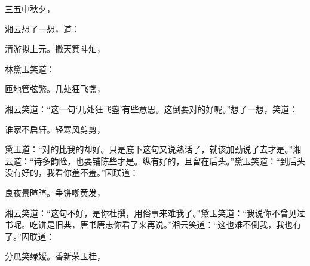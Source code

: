 \begin{poem}
    \begin{pl}三五中秋夕，\end{pl}
\end{poem}


\begin{parag}
    湘云想了一想，道：
\end{parag}


\begin{poem}
    \begin{pl} 清游拟上元。撒天箕斗灿，\end{pl}
\end{poem}


\begin{parag}
    林黛玉笑道：
\end{parag}


\begin{poem}
    \begin{pl}匝地管弦繁。几处狂飞盏，\end{pl}
\end{poem}


\begin{parag}
    湘云笑道：“这一句‘几处狂飞盏’有些意思。这倒要对的好呢。”想了一想，笑道：
\end{parag}


\begin{poem}
    \begin{pl}谁家不启轩。轻寒风剪剪，\end{pl}
\end{poem}


\begin{parag}
    黛玉道：“对的比我的却好。只是底下这句又说熟话了，就该加劲说了去才是。”湘云道：“诗多韵险，也要铺陈些才是。纵有好的，且留在后头。”黛玉笑道：“到后头没有好的，我看你羞不羞。”因联道：
\end{parag}


\begin{poem}
    \begin{pl}良夜景暄暄。争饼嘲黄发，\end{pl}
\end{poem}


\begin{parag}
    湘云笑道：“这句不好，是你杜撰，用俗事来难我了。”黛玉笑道：“我说你不曾见过书呢。吃饼是旧典，唐书唐志你看了来再说。”湘云笑道：“这也难不倒我，我也有了。”因联道：
\end{parag}


\begin{poem}
    \begin{pl}分瓜笑绿嫒。香新荣玉桂，\end{pl}
\end{poem}


